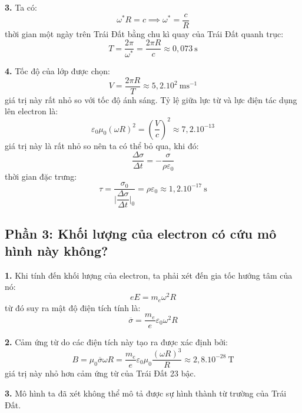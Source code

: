 \noindent\textbf{3.} Ta có:
\begin{equation*}
  \omega^{*}R=c\implies \omega^{*}=\frac{c}{R}
\end{equation*}
thời gian một ngày trên Trái Đất bằng chu kì quay của Trái Đất quanh trục:
\begin{equation*}
  T=\frac{2\pi}{\omega^{*}}=\frac{2\pi R}{c}\approx 0,073\SI{}{\second}
\end{equation*}

\noindent\textbf{4.} Tốc độ của lớp được chọn:
\begin{equation*}
  V=\frac{2\pi R}{T}\approx 5,2.10^{2}\SI{}{\metre\second^{-1}}
\end{equation*}
giá trị này rất nhỏ so với tốc độ ánh sáng. Tỷ lệ giữa lực từ và lực điện tác dụng lên electron là:
\begin{equation*}
  \varepsilon_{0}\mu_{0}(\omega R)^{2}=\left(\frac{V}{c}\right)^{2}\approx 7,2.10^{-13}
\end{equation*}
giá trị này là rất nhỏ so nên ta có thể bỏ qua, khi đó:
\begin{equation*}
  \frac{\Delta\sigma}{\Delta t}=-\frac{\sigma}{\rho\varepsilon_{0}}
\end{equation*}
thời gian đặc trưng:
\begin{equation*}
  \tau=\frac{\sigma_{0}}{\lvert \dfrac{\Delta\sigma}{\Delta t}\rvert _{0}}=\rho\varepsilon_{0}\approx1,2.10^{-17}\SI{}{\second}
\end{equation*}

\subsection*{Phần 3: Khối lượng của electron có cứu mô hình này không?}
\noindent\textbf{1.} Khi tính đến khối lượng của electron, ta phải xét đến gia tốc hướng tâm của nó:
\begin{equation*}
  eE=m_{e}\omega^{2}R
\end{equation*}
từ đó suy ra mật độ điện tích tính là:
\begin{equation*}
  \overline{\sigma}=\frac{m_{e}}{e}\varepsilon_{0}\omega^{2}R
\end{equation*}

\noindent\textbf{2.} Cảm ứng từ do các điện tích này tạo ra được xác định bởi:
\begin{equation*}
  B=\mu_{0}\overline{\sigma}\omega R=\frac{m_{e}}{e}\varepsilon_{0}\mu_{0}\frac{(\omega R)^{3}}{R}\approx2,8.10^{-28}\SI{}{\tesla}
\end{equation*}
giá trị này nhỏ hơn cảm ứng từ của Trái Đất 23 bậc.

\noindent\textbf{3.} Mô hình ta đã xét không thể mô tả được sự hình thành từ trường của Trái Đất.
